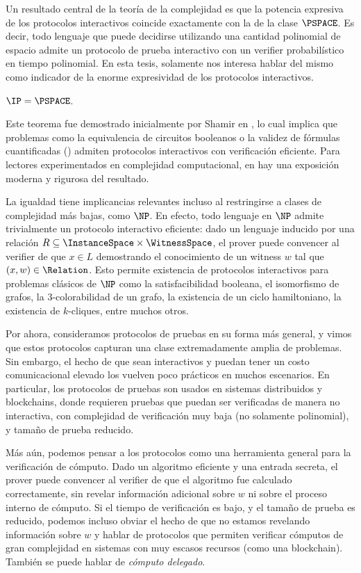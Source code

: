 Un resultado central de la teoría de la complejidad es que la potencia expresiva de los protocolos interactivos coincide exactamente con la de la clase $\PSPACE$. Es decir, todo lenguaje que puede decidirse utilizando una cantidad polinomial de espacio admite un protocolo de prueba interactivo con un verifier probabilístico en tiempo polinomial. En esta tesis, solamente nos interesa hablar del mismo como indicador de la enorme expresividad de los protocolos interactivos.

\begin{theorem}
	$\IP = \PSPACE$.
\end{theorem}

Este teorema fue demostrado inicialmente por Shamir en \cite{Shamir1992}, lo cual implica que problemas como la equivalencia de circuitos booleanos o la validez de fórmulas cuantificadas (\QBF) admiten protocolos interactivos con verificación eficiente. Para lectores experimentados en complejidad computacional, en \cite{arora2006computational} hay una exposición moderna y rigurosa del resultado.

La igualdad tiene implicancias relevantes incluso al restringirse a clases de complejidad más bajas, como $\NP$. En efecto, todo lenguaje en $\NP$ admite trivialmente un protocolo interactivo eficiente: dado un lenguaje inducido por una relación $R \subseteq \InstanceSpace \times \WitnessSpace$, el prover puede convencer al verifier de que $x \in L$ demostrando el conocimiento de un witness $w$ tal que $(x,w) \in \Relation$. Esto permite existencia de protocolos interactivos para problemas clásicos de $\NP$ como la satisfacibilidad booleana, el isomorfismo de grafos, la 3-colorabilidad de un grafo, la existencia de un ciclo hamiltoniano, la existencia de $k$-cliques, entre muchos otros.

Por ahora, consideramos protocolos de pruebas \ZK en su forma más general, y vimos que estos protocolos capturan una clase extremadamente amplia de problemas. Sin embargo, el hecho de que sean interactivos y puedan tener un costo comunicacional elevado los vuelven poco prácticos en muchos escenarios. En particular, los protocolos de pruebas \ZK son usados en sistemas distribuidos y blockchains, donde requieren pruebas que puedan ser verificadas de manera no interactiva, con complejidad de verificación muy baja (no solamente polinomial), y tamaño de prueba reducido.

Más aún, podemos pensar a los protocolos \ZK como una herramienta general para la verificación de cómputo. Dado un algoritmo eficiente y una entrada secreta, el prover puede convencer al verifier de que el algoritmo fue calculado correctamente, sin revelar información adicional sobre $w$ ni sobre el proceso interno de cómputo. Si el tiempo de verificación es bajo, y el tamaño de prueba es reducido, podemos incluso obviar el hecho de que no estamos revelando información sobre $w$ y hablar de protocolos \ZK que permiten verificar cómputos de gran complejidad en sistemas con muy escasos recursos (como una blockchain). También se puede hablar de \textit{cómputo delegado}.

